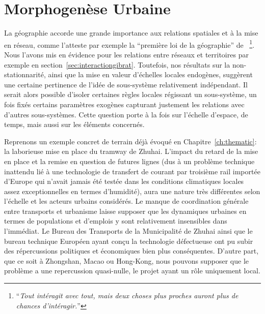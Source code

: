 



\chapter{Morphogenèse Urbaine}

\label{ch:morphogenesis} %





La géographie accorde une grande importance aux relations spatiales et à la mise en réseau, comme l'atteste par exemple la ``première loi de la géographie'' de ~\cite{tobler2004first}\footnote{``\textit{Tout intéragit avec tout, mais deux choses plus proches auront plus de chances d'intéragir.}''}. Nous l'avons mis en évidence pour les relations entre réseaux et territoires par exemple en section~\ref{sec:interactiongibrat}. Toutefois, nos résultats sur la non-stationnarité, ainsi que la mise en valeur d'échelles locales endogènes, suggèrent une certaine pertinence de l'idée de sous-système relativement indépendant. Il serait alors possible d'isoler certaines règles locales régissant un sous-système, un fois fixés certains paramètres exogènes capturant justement les relations avec d'autres sous-systèmes. Cette question porte à la fois sur l'échelle d'espace, de temps, mais aussi sur les éléments concernés.

Reprenons un exemple concret de terrain déjà évoqué en Chapitre~\ref{ch:thematic}: la laborieuse mise en place du tramway de Zhuhai. L'impact du retard de la mise en place et la remise en question de futures lignes (dus à un problème technique inattendu lié à une technologie de transfert de courant par troisième rail importée d'Europe qui n'avait jamais été testée dans les conditions climatiques locales assez exceptionnelles en termes d'humidité), aura une nature très différentes selon l'échelle et les acteurs urbains considérés. Le manque de coordination générale entre transports et urbanisme laisse supposer que les dynamiques urbaines en termes de populations et d'emplois y sont relativement insensibles dans l'immédiat. Le Bureau des Transports de la Municipalité de Zhuhai ainsi que le bureau technique Européen ayant conçu la technologie défectueuse ont pu subir des répercussions politiques et économiques bien plus conséquentes. D'autre part, que ce soit à Zhongshan, Macao ou Hong-Kong, nous pouvons supposer que le problème a une repercussion quasi-nulle, le projet ayant un rôle uniquement local.



